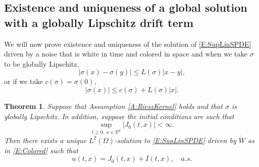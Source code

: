 \documentclass[a4paper,11pt]{article}
\numberwithin{equation}{section}
\theoremstyle{plain}
\newtheorem{theorem}{Theorem}[section]
\theoremstyle{definition}
\newcommand{\R}{\mathbb{R}}
\numberwithin{NQ}{section}
\numberwithin{LQ}{section}
\numberwithin{ZQ}{section}
\begin{document}
\subsection{Existence and uniqueness of a global solution with a globally Lipschitz drift term}

We will now prove existence and uniqueness of the solution of \eqref{E:SupLinSPDE} driven by a noise
that is white in time and colored in space and when we take $\sigma$ to be globally Lipschitz,
\[
  |\sigma(x) - \sigma(y)| \le L(\sigma)|x - y|,
\]
or if we take $c(\sigma) = \sigma(0)$,
\[
  |\sigma(x)| \le c(\sigma) +  L(\sigma)|x|.
\]

\begin{theorem} \label{T:ExisAndUniq}
   Suppose that Assumption \ref{A:RieszKernel} holds and that $\sigma$ is globally Lipschitz. In
   addition, suppose the initial conditions are such that
	 \[
	 	\sup_{t\ge 0, \: x \in \R^d} |J_0(t,x)| < \infty.
	 \]
   Then there exists a unique $L^2(\Omega)$-solution to \eqref{E:SupLinSPDE} driven by $\dot{W}$ as
   in \eqref{E:Colored} such that
	\[
	u(t,x) = J_0(t,x) + I(t,x), \quad a.s.
	\]
\end{theorem}
\end{document}
